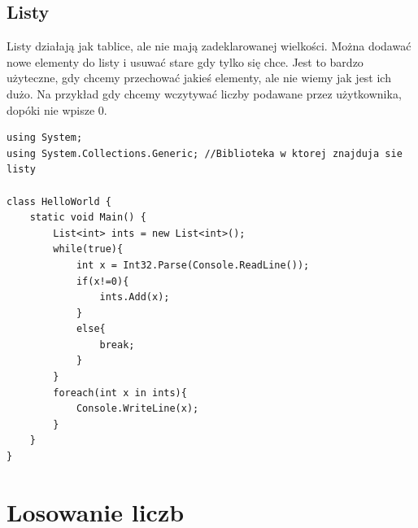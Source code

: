 \documentclass[a4paper]{article}
\theoremstyle{definition}
\begin{document}
\subsection{Listy}
Listy działają jak tablice, ale nie mają zadeklarowanej wielkości. Można dodawać nowe elementy do listy i usuwać stare gdy tylko się chce. Jest to bardzo użyteczne, gdy chcemy przechować jakieś elementy, ale nie wiemy jak jest ich dużo. Na przykład gdy chcemy wczytywać liczby podawane przez użytkownika, dopóki nie wpisze 0.
\begin{lstlisting}[frame=single]
using System;
using System.Collections.Generic; //Biblioteka w ktorej znajduja sie listy

class HelloWorld {
    static void Main() {
        List<int> ints = new List<int>();
        while(true){
            int x = Int32.Parse(Console.ReadLine());
            if(x!=0){
                ints.Add(x);   
            }
            else{
                break;
            }
        }
        foreach(int x in ints){
            Console.WriteLine(x);
        }
    }
}
\end{lstlisting}
\pagebreak
\section{Losowanie liczb}
\end{document}
